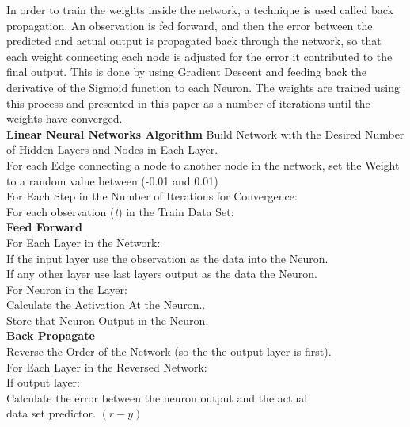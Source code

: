 \documentclass[twoside,11pt]{article}
\newcommand\tab[1][1cm]{\hspace*{#1}}
\begin{document}
\hspace*{10mm} In order to train the weights inside the network, a technique is used called back propagation. An observation is fed forward, and then the error between the predicted and actual output is propagated back through the network, so that each weight connecting each node is adjusted for the error it contributed to the final output. This is done by using Gradient Descent and feeding back the derivative of the Sigmoid function to each Neuron. The weights are trained using this process and presented in this paper as a number of iterations until the weights have converged.\\

\textbf{Linear Neural Networks Algorithm}\newline
Build Network with the Desired Number of Hidden Layers and Nodes in Each Layer.\\
For each Edge connecting a node to another node in the network, set the Weight to a random value between (-0.01 and 0.01) \\
For Each Step in the Number of Iterations for Convergence:\\
\tab For each observation (\textit{t}) in the Train Data Set:\\
\tab \tab \textbf{Feed Forward}\\
\tab \tab \tab For Each Layer in the Network:\\
\tab \tab \tab \tab If the input layer use the observation as the data into the Neuron.\\
\tab \tab \tab \tab If any other layer use last layers output as the data the Neuron.\\
\tab \tab \tab \tab  For Neuron in the Layer:\\
\tab \tab \tab \tab \tab Calculate the Activation At the Neuron..\\
\tab \tab \tab \tab \tab Store that Neuron Output in the Neuron.\\
\tab \tab \textbf{Back Propagate} \\
\tab \tab \tab Reverse the Order of the Network (so the the output layer is first).\\
\tab \tab \tab For Each Layer in the Reversed Network:\\
\tab \tab \tab \tab If output layer:\\
\tab \tab \tab \tab \tab Calculate the error between the neuron output and the actual\\ 
\tab \tab \tab \tab \tab data set predictor. $(r-y)$\\
\end{document}
